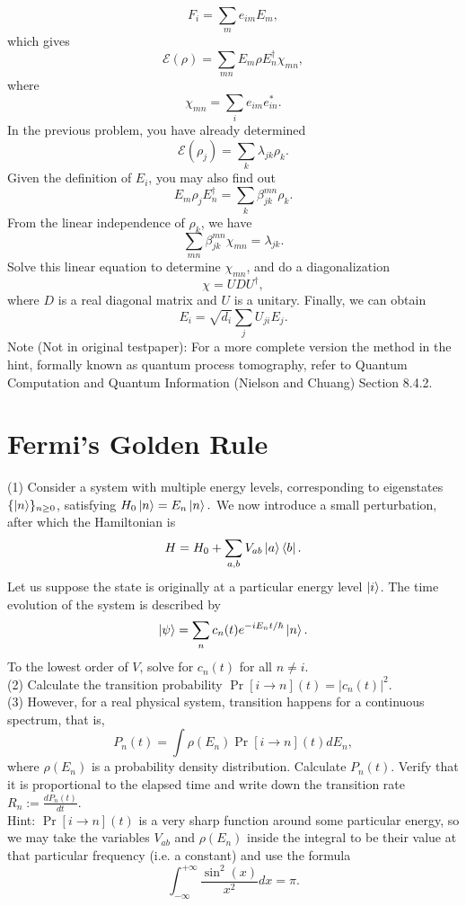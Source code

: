 \documentclass[12pt]{article}
\begin{document}
\[F_i=\sum_me_{im}E_m,\]
which gives
\[\mathcal E(\rho)=\sum_{mn}E_m\rho E_n^\dagger\chi_{mn},\]
where
\[\chi_{mn}=\sum_ie_{im}e_{in}^*.\]
In the previous problem, you have already determined
\[\mathcal E(\rho_j)=\sum_k\lambda_{jk}\rho_k.\]
Given the definition of $E_i$, you may also find out
\[E_m\rho_jE_n^\dagger=\sum_{k}\beta^{mn}_{jk}\rho_k.\]
From the linear independence of $\rho_k$, we have
\[\sum_{mn}\beta^{mn}_{jk}\chi_{mn}=\lambda_{jk}.\]
Solve this linear equation to determine $\chi_{mn}$, and do a diagonalization
\[\chi=UDU^{\dagger},\]
where $D$ is a real diagonal matrix and $U$ is a unitary.
Finally, we can obtain
\[E_i=\sqrt{d_i}\sum_{j}U_{ji}E_{j}.\]
Note (Not in original testpaper): For a more complete version the method in the hint, formally known as quantum process tomography, refer to Quantum Computation and Quantum Information (Nielson and Chuang) Section 8.4.2.

\section{Fermi's Golden Rule}
(1) Consider a system with multiple energy levels, corresponding to eigenstates $\{\ket{n}\}_{n\geq0}$, satisfying $H_0\ket n=E_n\ket n.$ We now introduce a small perturbation, after which the Hamiltonian is
\[H=H_0+\sum_{a,b}V_{ab}\ket a\bra b.\]
Let us suppose the state is originally at a particular energy level $\ket i$. The time evolution of the system is described by 
\[\ket \psi=\sum_nc_n(t)e^{-iE_nt/\hbar}\ket n.\] To the lowest order of $V$, solve for $c_n(t)$ for all $n\neq i$.\\
(2) Calculate the transition probability $\Pr[i\rightarrow n](t)=|c_n(t)|^2.$\\
(3) However, for a real physical system, transition happens for a continuous spectrum, that is,
\[P_n(t)=\int\rho(E_n)\Pr[i\rightarrow n](t)dE_n,\]
where $\rho(E_n)$ is a probability density distribution. Calculate $P_n(t)$. Verify that it is proportional to the elapsed time and write down the transition rate $R_n:=\frac{dP_n(t)}{dt}$.\\
Hint: $\Pr[i\rightarrow n](t)$ is a very sharp function around some particular energy, so we may take the variables $V_{ab}$ and $\rho(E_n)$ inside the integral to be their value at that particular frequency (i.e. a constant) and use the formula
\[\int_{-\infty}^{+\infty}\frac{\sin^2(x)}{x^2}dx=\pi.\]
\end{document}

